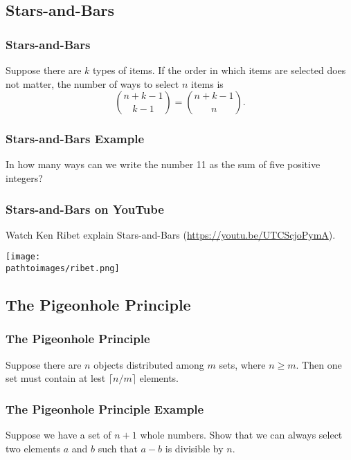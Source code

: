 \documentclass{beamer}
\newcommand{\pathtoimages}{/Users/charlesrambo/Desktop/Bootcamp24/Images}
\begin{document}
\subsection{Stars-and-Bars}

\begin{frame}
\frametitle{Stars-and-Bars}

\begin{Theorem}
Suppose there are $k$ types of items. If the order in which items are selected does not matter, the number of ways to select $n$ items is
$$
{n + k - 1\choose k - 1} = {n + k - 1\choose n}.
$$
\end{Theorem}
\end{frame}

\begin{frame}[t]
\frametitle{Stars-and-Bars Example}
\begin{Example}
In how many ways can we write the number 11 as the sum of five positive integers?
\end{Example}
\end{frame}

\begin{frame}
\frametitle{Stars-and-Bars on YouTube}
\small 
Watch Ken Ribet explain Stars-and-Bars (\url{https://youtu.be/UTCScjoPymA}).
\begin{center}
\texttt{[image: \\pathtoimages/ribet.png]}
\end{center}

\end{frame}

\subsection{The Pigeonhole Principle}

\begin{frame}
\frametitle{The Pigeonhole Principle}

\begin{Theorem}
Suppose there are $n$ objects distributed among $m$ sets, where $n \geq m$. Then one set must contain at lest $\lceil n/m \rceil$ elements.
\end{Theorem}
\end{frame}

\begin{frame}[t]
\frametitle{The Pigeonhole Principle Example}
\begin{Example}
Suppose we have a set of $n + 1$ whole numbers. Show that we can always select two elements $a$ and $b$ such that $a - b$ is divisible by $n$.
\end{Example}

\end{frame}
\end{document}
